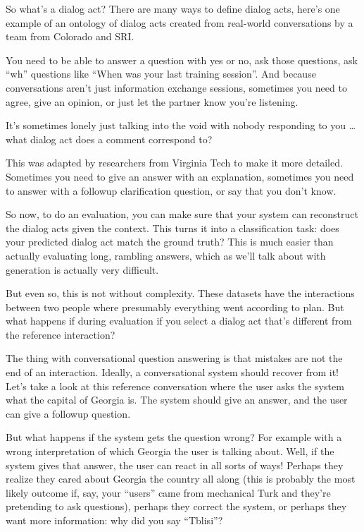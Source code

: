So what’s a dialog act?  There are many ways to define dialog acts, here’s one example of an ontology of dialog acts created from real-world conversations by a team from Colorado and SRI.  

You need to be able to answer a question with yes or no, ask those questions, ask “wh” questions like “When was your last training session”.  And because conversations aren’t just information exchange sessions, sometimes you need to agree, give an opinion, or just let the partner know you’re listening.  

It’s sometimes lonely just talking into the void with nobody responding to you … what dialog act does a comment correspond to?

This was adapted by researchers from Virginia Tech to make it more detailed.  Sometimes you need to give an answer with an explanation, sometimes you need to answer with a followup clarification question, or say that you don’t know.

So now, to do an evaluation, you can make sure that your system can reconstruct the dialog acts given the context.  This turns it into a classification task: does your predicted dialog act match the ground truth?  This is much easier than actually evaluating long, rambling answers, which as we’ll talk about with generation is actually very difficult.

But even so, this is not without complexity.  These datasets have the interactions between two people where presumably everything went according to plan.  But what happens if during evaluation if you select a dialog act that’s different from the reference interaction?

The thing with conversational question answering is that mistakes are not the end of an interaction.  Ideally, a conversational system should recover from it!  Let’s take a look at this reference conversation where the user asks the system what the capital of Georgia is. The system should give an answer, and the user can give a followup question.

But what happens if the system gets the question wrong?  For example with a wrong interpretation of which Georgia the user is talking about.  Well, if the system gives that answer, the user can react in all sorts of ways!  Perhaps they realize they cared about Georgia the country all along (this is probably the most likely outcome if, say, your “users” came from mechanical Turk and they’re pretending to ask questions), perhaps they correct the system, or perhaps they want more information: why did you say “Tblisi”?

